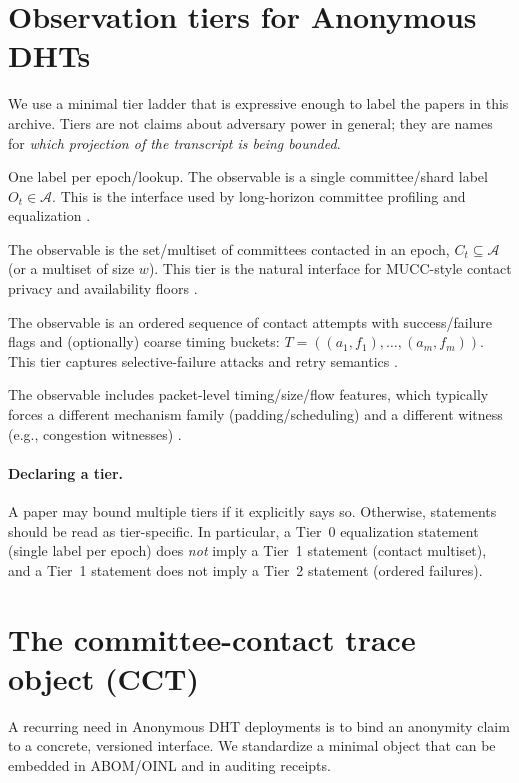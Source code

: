 \documentclass[11pt]{article}
\begin{document}
\section{Observation tiers for Anonymous DHTs}\label{sec:tiers}
We use a minimal tier ladder that is expressive enough to label the papers in this archive.
Tiers are not claims about adversary power in general; they are names for \emph{which projection of the transcript is being bounded}.

\begin{description}[leftmargin=*]
\item[Tier 0: destination label.] One label per epoch/lookup.
The observable is a single committee/shard label $O_t\in\mathcal{A}$.
This is the interface used by long-horizon committee profiling and equalization \cite{series:profiling}.

\item[Tier 1: contact set or multiset.] The observable is the set/multiset of committees contacted in an epoch,
$C_t\subseteq \mathcal{A}$ (or a multiset of size $w$).
This tier is the natural interface for MUCC-style contact privacy and availability floors \cite{series:state2}.

\item[Tier 2: ordered trace with failures.] The observable is an ordered sequence of contact attempts with success/failure flags and (optionally) coarse timing buckets:
$T = ((a_1,f_1),\ldots,(a_m,f_m))$.
This tier captures selective-failure attacks and retry semantics \cite{WangMittalBorisovCCS2010}.

\item[Tier 3: packet/flow metadata.] The observable includes packet-level timing/size/flow features, which typically forces a different mechanism family (padding/scheduling) and a different witness (e.g., congestion witnesses) \cite{series:schedcompiler,series:congeq}.
\end{description}

\paragraph{Declaring a tier.}
A paper may bound multiple tiers if it explicitly says so.
Otherwise, statements should be read as tier-specific.
In particular, a Tier~0 equalization statement (single label per epoch) does \emph{not} imply a Tier~1 statement (contact multiset), and a Tier~1 statement does not imply a Tier~2 statement (ordered failures).

\section{The committee-contact trace object (CCT)}\label{sec:cct}
A recurring need in Anonymous DHT deployments is to bind an anonymity claim to a concrete, versioned interface.
We standardize a minimal object that can be embedded in ABOM/OINL and in auditing receipts.
\end{document}
